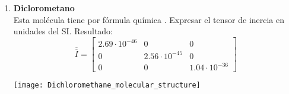 \documentclass[11pt, spanish, a4paper, twoside]{article}
\begin{document}
\begin{enumerate}
	

	\item 
	\begin{minipage}[t][3cm]{0.73\textwidth}
	\textbf{Diclorometano}\\
	Esta molécula tiene por fórmula química . Expresar el tensor de inercia en unidades del SI.
		Resultado:\\
		\[
			\overline{\overline{I}} = \left[\begin{matrix}2.69 \cdot 10^{-46} & 0 & 0\\0 & 2.56 \cdot 10^{-45} & 0\\0 & 0 & 1.04 \cdot 10^{-36}\end{matrix}\right]
		\]
	\end{minipage}
	\begin{minipage}[c][0.5cm][t]{0.2\textwidth}
		\texttt{[image: Dichloromethane\_molecular\_structure]}
	\end{minipage}




\end{enumerate}
\end{document}
